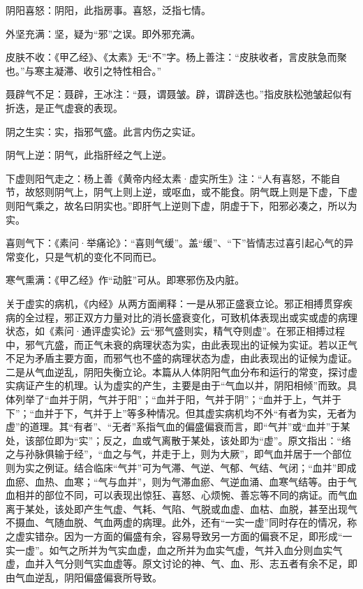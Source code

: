 \documentclass[draft,12pt]{ctexbook}
\begin{document}
\begin{jiaozhu}
	\item 阴阳喜怒：阴阳，此指房事。喜怒，泛指七情。
	\item 外坚充满：坚，疑为“邪”之误。即外邪充满。
	\item 皮肤不收：《甲乙经》、《太素》无“不”字。杨上善注：“皮肤收者，言皮肤急而聚也。”与寒主凝滞、收引之特性相合。”
	\item 聂辟气不足：聂辟，王冰注：“聂，谓聂皱。辟，谓辟迭也。”指皮肤松弛皱起似有折迭，是正气虚衰的表现。
	\item 阴之生实：实，指邪气盛。此言内伤之实证。
	\item 阴气上逆：阴气，此指肝经之气上逆。
	\item 下虚则阳气走之：杨上善《黄帝内经太素·虚实所生》注：“人有喜怒，不能自节，故怒则阴气上，阴气上则上逆，或呕血，或不能食。阴气既上则是下虚，下虚则阳气乘之，故名曰阴实也。”即肝气上逆则下虚，阴虚于下，阳邪必凑之，所以为实。
	\item 喜则气下：《素问·举痛论》：“喜则气缓”。盖“缓”、“下”皆情志过喜引起心气的异常变化，只是气机的变化不同而已。
	\item 寒气熏满：《甲乙经》作“动脏”可从。即寒邪伤及内脏。
\end{jiaozhu}



关于虚实的病机，《内经》从两方面阐释：一是从邪正盛衰立论。邪正相搏贯穿疾病的全过程，邪正双方力量对比的消长盛衰变化，可致机体表现出或实或虚的病理状态，如《素问·通评虚实论》云“邪气盛则实，精气夺则虚”。在邪正相搏过程中，邪气亢盛，而正气未衰的病理状态为实，由此表现出的证候为实证。若以正气不足为矛盾主要方面，而邪气也不盛的病理状态为虚，由此表现出的证候为虚证。二是从气血逆乱，阴阳失衡立论。本篇从人体阴阳气血分布和运行的常变，探讨虚实病证产生的机理。认为虚实的产生，主要是由于“气血以并，阴阳相倾”而致。具体列举了“血并于阴，气并于阳”；“血并于阳，气并于阴”；“血并于上，气并于下”；“血并于下，气并于上”等多种情况。但其虚实病机均不外“有者为实，无者为虚”的道理。其“有者”、“无者”系指气血的偏盛偏衰而言，即“气并”或“血并”于某处，该部位即为“实”；反之，血或气离散于某处，该处即为“虚”。原文指出：“络之与孙脉俱输于经”，“血之与气，并走于上，则为大厥”，即气血并居于一个部位则为实之例证。结合临床“气并”可为气滞、气逆、气郁、气结、气闭；“血并”即成血瘀、血热、血寒；“气与血并”，则为气滞血瘀、气逆血涌、血寒气结等。由于气血相并的部位不同，可以表现出惊狂、喜怒、心烦惋、善忘等不同的病证。而气血离于某处，该处即产生气虚、气耗、气陷、气脱或血虚、血枯、血脱，甚至出现气不摄血、气随血脱、气血两虚的病理。此外，还有“一实一虚”同时存在的情况，称之虚实错杂。因为一方面的偏盛有余，容易导致另一方面的偏衰不足，即形成“一实一虚”。如气之所并为气实血虚，血之所并为血实气虚，气并入血分则血实气虚，血并入气分则气实血虚等。原文讨论的神、气、血、形、志五者有余不足，即由气血逆乱，阴阳偏盛偏衰所导致。
\end{document}
